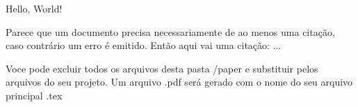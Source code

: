 \documentclass{article}
\begin{document}
Hello, World!

Parece que um documento precisa necessariamente de ao menos uma citação, caso contrário um erro é emitido. Então aqui vai uma citação: \citet{ref1}...

Voce pode excluir todos os arquivos desta pasta /paper e substituir pelos arquivos do seu projeto. Um arquivo .pdf será gerado com o nome do seu arquivo principal .tex


\end{document}
